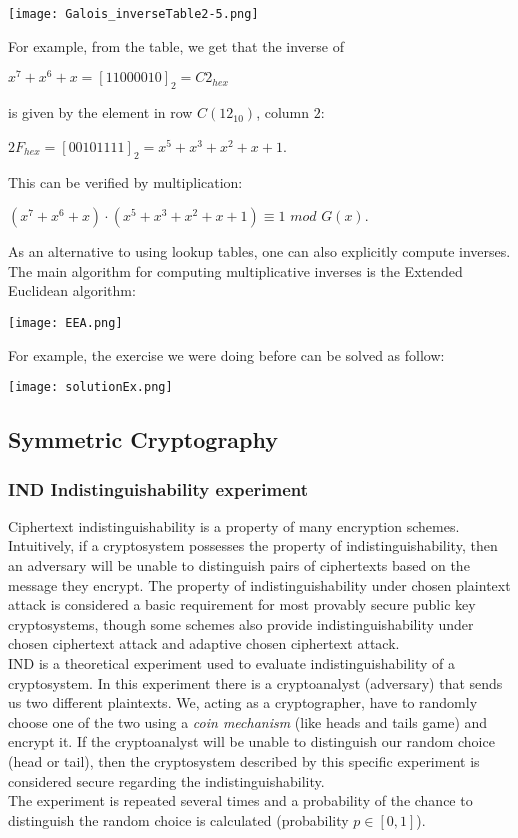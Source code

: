 \documentclass{article}
\begin{document}
\begin{flushleft}
\texttt{[image: Galois\_inverseTable2-5.png]}
\end{flushleft}

For example, from the table, we get that the inverse of
\begin{center}
    $x^7 + x^6 + x = [11000010]_2 = C2_{hex}$
\end{center}
is given by the element in row $C (12_{10})$, column $2$:
\begin{center}
    $2F_{hex} = [00101111]_2 = x^5 + x^3 + x^2 +x +1$.
\end{center}
This can be verified by multiplication:
\begin{center}
    $(x^7 + x^6 + x) \cdot (x^5 + x^3 + x^2 + x + 1) \equiv 1$ $mod$ $G(x)$.
\end{center}
As an alternative to using lookup tables, one can also explicitly compute inverses. The main algorithm for computing multiplicative inverses is the Extended Euclidean algorithm:
\begin{center}
    \texttt{[image: EEA.png]}
\end{center}

For example, the exercise we were doing before can be solved as follow:
\begin{center}
    \texttt{[image: solutionEx.png]}
\end{center}

\subsection{Symmetric Cryptography}
\subsubsection{IND Indistinguishability experiment}
Ciphertext indistinguishability is a property of many encryption schemes. Intuitively, if a cryptosystem possesses the property of indistinguishability, then an adversary will be unable to distinguish pairs of ciphertexts based on the message they encrypt. The property of indistinguishability under chosen plaintext attack is considered a basic requirement for most provably secure public key cryptosystems, though some schemes also provide indistinguishability under chosen ciphertext attack and adaptive chosen ciphertext attack.\\
IND is a theoretical experiment used to evaluate indistinguishability of a cryptosystem.
In this experiment there is a cryptoanalyst (adversary) that sends us two different plaintexts. We, acting as a cryptographer, have to randomly choose one of the two using a \textit{coin mechanism} (like heads and tails game) and encrypt it. If the cryptoanalyst will be unable to distinguish our random choice (head or tail), then the cryptosystem described by this specific experiment is considered secure regarding the indistinguishability.\\
The experiment is repeated several times and a probability of the chance to distinguish the random choice is calculated (probability $p \in [0,1]$).
\end{document}
